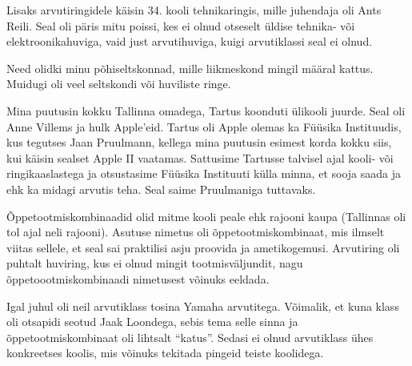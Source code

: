 Lisaks arvutiringidele käisin 34. kooli 
tehnikaringis, mille juhendaja oli Ants Reili. Seal oli 
päris mitu poissi, kes ei olnud otseselt üldise tehnika- 
või elektroonikahuviga, vaid just arvutihuviga, kuigi arvutiklassi
seal ei olnud.

Need olidki minu põhiseltskonnad, mille liikmeskond mingil määral kattus. Muidugi oli 
veel seltskondi või huviliste ringe.


Mina puutusin kokku Tallinna omadega, Tartus koonduti ülikooli 
juurde. Seal oli Anne Villems ja hulk
Apple'eid. Tartus oli Apple olemas ka Füüsika 
Instituudis, kus tegutses Jaan 
Pruulmann, kellega mina puutusin esimest korda kokku siis, 
kui käisin sealset Apple II vaatamas. Sattusime Tartusse talvisel ajal kooli- või 
ringikaaslastega ja otsustasime Füüsika Instituuti külla minna, 
et sooja saada ja ehk ka midagi
arvutis teha. Seal saime Pruulmaniga tuttavaks.

\label{content!OTK}

Õppetootmiskombinaadid olid mitme kooli peale ehk rajooni 
kaupa (Tallinnas oli tol ajal neli rajooni). 
Asutuse nimetus oli õppetootmiskombinaat, mis ilmselt viitas 
sellele, et seal sai praktilisi asju proovida ja 
ametikogemusi. Arvutiring oli puhtalt huviring, kus ei 
olnud mingit tootmisväljundit, nagu õppetoootmiskombinaadi nimetusest võinuks 
eeldada.


Igal juhul oli neil arvutiklass tosina Yamaha arvutitega. Võimalik, et 
kuna klass oli otsapidi seotud Jaak Loondega, sebis tema selle sinna ja õppetootmiskombinaat oli lihtsalt \enquote{katus}. 
Sedasi ei olnud arvutiklass ühes konkreetses koolis, mis võinuks tekitada pingeid teiste koolidega.


